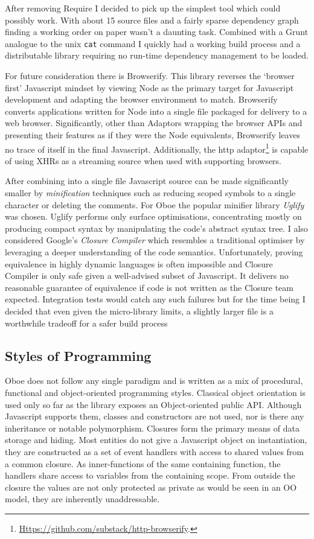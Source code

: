 \documentclass[]{article}
\begin{document}
After removing Require I decided to pick up the simplest tool which
could possibly work. With about 15 source files and a fairly sparse
dependency graph finding a working order on paper wasn't a daunting
task. Combined with a Grunt analogue to the unix \texttt{cat} command I
quickly had a working build process and a distributable library
requiring no run-time dependency management to be loaded.

For future consideration there is Browserify. This library reverses the
`browser first' Javascript mindset by viewing Node as the primary target
for Javascript development and adapting the browser environment to
match. Browserify converts applications written for Node into a single
file packaged for delivery to a web browser. Significantly, other than
Adaptors wrapping the browser APIs and presenting their features as if
they were the Node equivalents, Browserify leaves no trace of itself in
the final Javascript. Additionally, the http adaptor\footnote{\href{https://github.com/substack/http-browserify}{Https://github.com/substack/http-browserify}.}
is capable of using XHRs as a streaming source when used with supporting
browsers.

After combining into a single file Javascript source can be made
significantly smaller by \emph{minification} techniques such as reducing
scoped symbols to a single character or deleting the comments. For Oboe
the popular minifier library \emph{Uglify} was chosen. Uglify performs
only surface optimisations, concentrating mostly on producing compact
syntax by manipulating the code's abstract syntax tree. I also
considered Google's \emph{Closure Compiler} which resembles a
traditional optimiser by leveraging a deeper understanding of the code
semantics. Unfortunately, proving equivalence in highly dynamic
languages is often impossible and Closure Compiler is only safe given a
well-advised subset of Javascript. It delivers no reasonable guarantee
of equivalence if code is not written as the Closure team expected.
Integration tests would catch any such failures but for the time being I
decided that even given the micro-library limits, a slightly larger file
is a worthwhile tradeoff for a safer build process

\subsection{Styles of Programming}

Oboe does not follow any single paradigm and is written as a mix of
procedural, functional and object-oriented programming styles. Classical
object orientation is used only so far as the library exposes an
Object-oriented public API. Although Javascript supports them, classes
and constructors are not used, nor is there any inheritance or notable
polymorphism. Closures form the primary means of data storage and
hiding. Most entities do not give a Javascript object on instantiation,
they are constructed as a set of event handlers with access to shared
values from a common closure. As inner-functions of the same containing
function, the handlers share access to variables from the containing
scope. From outside the closure the values are not only protected as
private as would be seen in an OO model, they are inherently
unaddressable.
\end{document}
